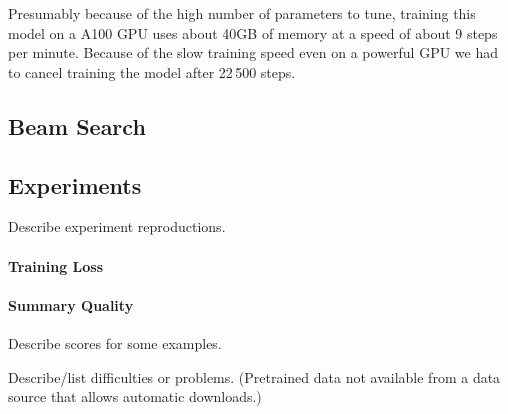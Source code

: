 Presumably because of the high number of parameters to tune, training this \BertSumAbs model on a A100 GPU uses about 40GB of memory at a speed of about 9 steps per minute.
Because of the slow training speed even on a powerful GPU we had to cancel training the model after 22\,500 steps.

\subsection{Beam Search}

\subsection{Experiments}

Describe experiment reproductions.

\paragraph{Training Loss}




\paragraph{Summary Quality}

Describe \Rouge scores for some examples.

Describe/list difficulties or problems. (Pretrained data not available from a data source that allows automatic downloads.)
